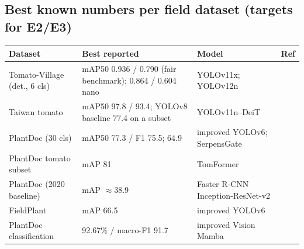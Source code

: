 \subsection{Best known numbers per field dataset (targets for E2/E3)}
\begin{center}\small
\begin{tabular}{@{}L{3.6cm}L{4.2cm}L{3.8cm}L{3.2cm}@{}}
\toprule
Dataset & Best reported & Model & Ref \\
\midrule
Tomato-Village (det., 6 cls) & mAP50 0.936 / 0.790 (fair benchmark); 0.864 / 0.604 nano & YOLOv11x; YOLOv12n & \cite{ramos2025} \\
Taiwan tomato & mAP50 97.8 / 93.4; YOLOv8 baseline 77.4 on a subset & YOLOv11n--DeiT & \cite{taiwanyolo11} \\
PlantDoc (30 cls) & mAP50 77.3 / F1 75.5; 64.9 & improved YOLOv6; SerpensGate & \cite{wang2024v6,serpensgate} \\
PlantDoc tomato subset & mAP 81 & TomFormer & \cite{tomformer} \\
PlantDoc (2020 baseline) & mAP $\approx$38.9 & Faster R-CNN Inception-ResNet-v2 & \cite{plantdoc} \\
FieldPlant & mAP 66.5 & improved YOLOv6 & \cite{wang2024v6} \\
PlantDoc classification & 92.67\% / macro-F1 91.7 & improved Vision Mamba & \cite{vmambaplantdoc} \\
\bottomrule
\end{tabular}
\end{center}

